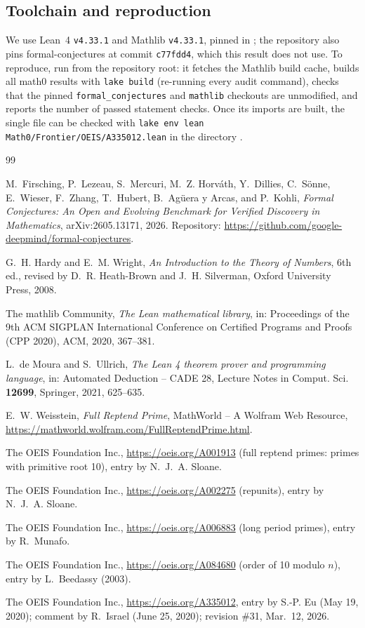 \documentclass[11pt]{amsart}
\theoremstyle{plain}
\theoremstyle{definition}
\begin{document}
\subsection*{Toolchain and reproduction}
We use Lean~4 \cite{Lean4} \texttt{v4.33.1} and Mathlib \cite{Mathlib} \texttt{v4.33.1}, pinned in ; the repository also pins formal-conjectures \cite{FC} at commit \texttt{c77fdd4}, which this result does not use.
To reproduce, run  from the repository root: it fetches the Mathlib build cache, builds all math0 results with \texttt{lake build} (re-running every audit command), checks that the pinned \texttt{formal\_conjectures} and \texttt{mathlib} checkouts are unmodified, and reports the number of passed statement checks. Once its imports are built, the single file can be checked with \texttt{lake env lean Math0/Frontier/OEIS/A335012.lean} in the directory .

{\small
\begin{thebibliography}{99}

M.~Firsching, P.~Lezeau, S.~Mercuri, M.~Z. Horv\'ath, Y.~Dillies, C.~S\"onne, E.~Wieser, F.~Zhang, T.~Hubert, B.~Ag\"uera y Arcas, and P.~Kohli, \emph{Formal Conjectures: An Open and Evolving Benchmark for Verified Discovery in Mathematics}, arXiv:2605.13171, 2026. Repository: \url{https://github.com/google-deepmind/formal-conjectures}.

G.~H. Hardy and E.~M. Wright, \emph{An Introduction to the Theory of Numbers}, 6th ed., revised by D.~R. Heath-Brown and J.~H. Silverman, Oxford University Press, 2008.

The mathlib Community, \emph{The Lean mathematical library}, in: Proceedings of the 9th ACM SIGPLAN International Conference on Certified Programs and Proofs (CPP 2020), ACM, 2020, 367--381.

L.~de Moura and S.~Ullrich, \emph{The Lean 4 theorem prover and programming language}, in: Automated Deduction -- CADE 28, Lecture Notes in Comput. Sci. \textbf{12699}, Springer, 2021, 625--635.

E.~W. Weisstein, \emph{Full Reptend Prime}, MathWorld -- A Wolfram Web Resource, \url{https://mathworld.wolfram.com/FullReptendPrime.html}.

The OEIS Foundation Inc., \url{https://oeis.org/A001913} (full reptend primes: primes with primitive root 10), entry by N.~J.~A. Sloane.

The OEIS Foundation Inc., \url{https://oeis.org/A002275} (repunits), entry by N.~J.~A. Sloane.

The OEIS Foundation Inc., \url{https://oeis.org/A006883} (long period primes), entry by R.~Munafo.

The OEIS Foundation Inc., \url{https://oeis.org/A084680} (order of 10 modulo $n$), entry by L.~Beedassy (2003).

The OEIS Foundation Inc., \url{https://oeis.org/A335012}, entry by S.-P. Eu (May 19, 2020); comment by R.~Israel (June 25, 2020); revision \#31, Mar.~12, 2026.

\end{thebibliography}
}
\end{document}
